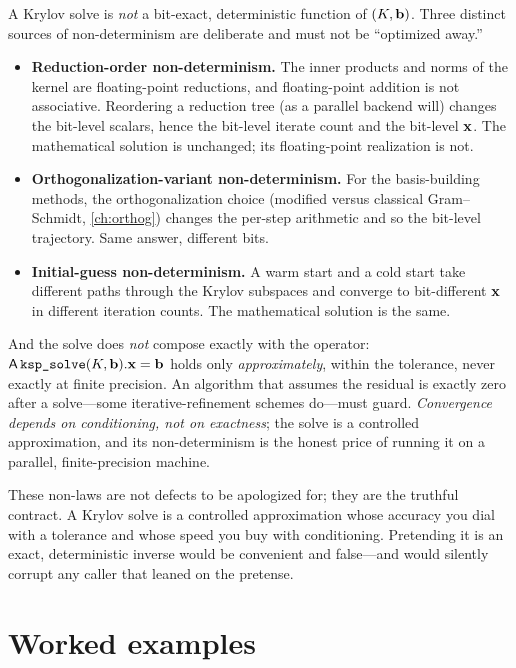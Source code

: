 \begin{pitfall}
A Krylov solve is \emph{not} a bit-exact, deterministic function of $(K,\mathbf{b})$. Three
distinct sources of non-determinism are deliberate and must not be ``optimized
away.''
\begin{itemize}[nosep]
  \item \textbf{Reduction-order non-determinism.} The inner products and norms of the
  kernel are floating-point reductions, and floating-point addition is not
  associative. Reordering a reduction tree (as a parallel backend will) changes the
  bit-level scalars, hence the bit-level iterate count and the bit-level $\mathbf{x}$. The
  mathematical solution is unchanged; its floating-point realization is not.
  \item \textbf{Orthogonalization-variant non-determinism.} For the basis-building
  methods, the orthogonalization choice (modified versus classical Gram--Schmidt,
  \cref{ch:orthog}) changes the per-step arithmetic and so the bit-level trajectory.
  Same answer, different bits.
  \item \textbf{Initial-guess non-determinism.} A warm start and a cold start take
  different paths through the Krylov subspaces and converge to bit-different $\mathbf{x}$
  in different iteration counts. The mathematical solution is the same.
\end{itemize}
And the solve does \emph{not} compose exactly with the operator: $\mathsf{A}\,
\texttt{ksp\_solve}(K,\mathbf{b}).\mathbf{x}=\mathbf{b}$ holds only \emph{approximately}, within the
tolerance, never exactly at finite precision. An algorithm that assumes the residual
is exactly zero after a solve---some iterative-refinement schemes do---must guard.
\emph{Convergence depends on conditioning, not on exactness}; the solve is a
controlled approximation, and its non-determinism is the honest price of running it
on a parallel, finite-precision machine.
\end{pitfall}

These non-laws are not defects to be apologized for; they are the truthful contract.
A Krylov solve is a controlled approximation whose accuracy you dial with a
tolerance and whose speed you buy with conditioning. Pretending it is an exact,
deterministic inverse would be convenient and false---and would silently corrupt any
caller that leaned on the pretense.

\section{Worked examples}
\label{sec:krylov-wex}

